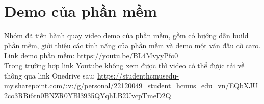 \section{Demo của phần mềm}
Nhóm đã tiến hành quay video demo của phần mềm, gồm có hướng dẫn build phần mềm, giới thiệu các tính năng của phần mềm và demo một ván đấu cờ caro.\\
Link demo phần mềm: \url{https://youtu.be/BL4MvyyPfo0}\\
Trong trường hợp link Youtube không xem được thì video có thể được tải về thông qua link Onedrive sau: \url{https://studenthcmusedu-my.sharepoint.com/:v:/g/personal/22120049_student_hcmus_edu_vn/EQbXJU2co3RBi6tn0BNZR0YBl3935QYqhLB2UvcpTmeD2Q}